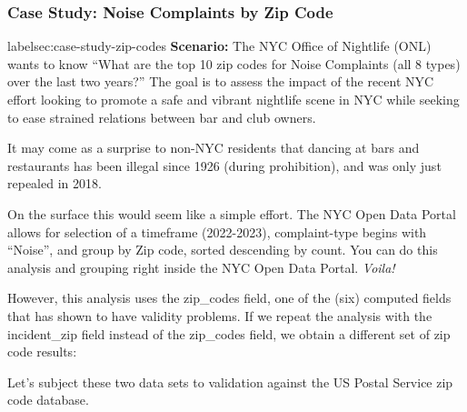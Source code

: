 \documentclass[12pt, titlepage]{article}
\begin{document}
		\subsubsection{Case Study: Noise Complaints by Zip Code}{label{sec:case-study-zip-codes}
		\textbf{Scenario:} The NYC Office of Nightlife (ONL) wants to know ``What are the top 10 zip codes for Noise Complaints (all 8 types) over the last two years?''
		The goal is to assess the impact of the recent NYC effort looking to promote a safe and vibrant nightlife scene in NYC while seeking to ease
		strained relations between bar and club owners. 
		
		It may come as a surprise to non-NYC residents that dancing at bars and restaurants has been illegal since 1926 (during prohibition), and was only just repealed in 2018. 
		
		On the surface this would seem like a simple effort.  The NYC Open Data Portal allows for selection of a timeframe (2022-2023), complaint-type
		begins with ``Noise'', and group by Zip code, sorted descending by count.  You can do this analysis and grouping right inside the NYC Open Data Portal. \textit{Voila!}

		However, this analysis uses the zip\_codes field, one of the (six) computed fields that has shown to have validity problems. If we repeat the analysis with the 
		incident\_zip field instead of the zip\_codes field, we obtain a different set of zip code results:
		
		Let's subject these two data sets to validation against the US Postal Service zip code database.
	 
}
\end{document}
